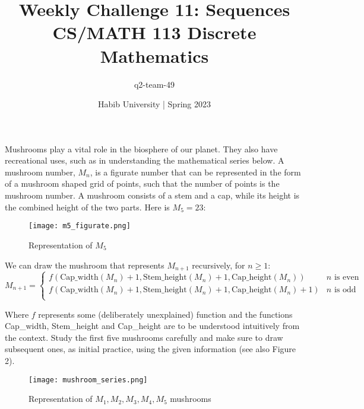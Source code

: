 \documentclass[a4paper]{exam}
\title{Weekly Challenge 11: Sequences\\CS/MATH 113 Discrete Mathematics}
\author{q2-team-49}  %
\date{Habib University | Spring 2023}
\begin{document}
\maketitle

\begin{questions}


 Mushrooms play a vital role in the biosphere of our planet. They also have recreational uses, such as in understanding the mathematical series below. A mushroom number, $M_n$, is a figurate number that can be represented in the form of a mushroom shaped grid of points, such that the number of points is the mushroom number. A mushroom consists of a stem and a cap, while its height is the combined height of the two parts. Here is $M_5=23$:
 
 \begin{figure}[h]
 	\centering
 	\texttt{[image: m5\_figurate.png]}
 	\caption{Representation of $M_5$}
 	\label{fig:mushroom_anatomy}
 \end{figure}
 
 We can draw the mushroom that represents $M_{n+1}$ recursively, for $n \geq 1$:
 \[ 
 M_{n+1}=
 \begin{cases} 
 f(\textrm{Cap\_width}(M_n) + 1, \textrm{Stem\_height}(M_n) + 1, \textrm{Cap\_height}(M_n))  & n \textrm{ is even} \\
 f(\textrm{Cap\_width}(M_n) + 1, \textrm{Stem\_height}(M_n) + 1, \textrm{Cap\_height}(M_n)+1) & n \textrm{ is odd}  \\      
 \end{cases}
 \]
 
 Where $f$ represents some (deliberately unexplained) function and the functions Cap\_width, Stem\_height and Cap\_height are to be understood intuitively from the context. Study the first five mushrooms carefully and make sure to draw subsequent ones, as initial practice, using the given information (see also Figure 2).
 
 \begin{figure}[H]
 	\centering
 	\texttt{[image: mushroom\_series.png]}
 	\\
 	\caption{Representation of $M_1,M_2,M_3,M_4,M_5$ mushrooms}
 	\label{fig:mushroom_series}
 \end{figure}

 
\end{questions}
\end{document}
